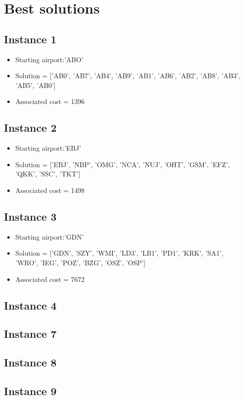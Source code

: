 \chapter{Best solutions}
\label{AppendixD}

\section*{Instance 1}
\begin{itemize}
    \item Starting airport:'ABO'
    \item Solution = ['AB0', 'AB7', 'AB4', 'AB9', 'AB1', 'AB6', 'AB2', 'AB8', 'AB3', 'AB5', 'AB0']
    \item Associated cost = 1396
\end{itemize}

\section*{Instance 2}
\begin{itemize}
    \item Starting airport:'EBJ'
    \item Solution = ['EBJ', 'NBP', 'OMG', 'NCA', 'NUJ', 'OHT', 'GSM', 'EFZ', 'QKK', 'SSC', 'TKT']
    \item Associated cost = 1498
\end{itemize}
\section*{Instance 3}
\begin{itemize}
    \item Starting airport:'GDN'
    \item Solution = ['GDN', 'SZY', 'WMI', 'LD3', 'LB1', 'PD1', 'KRK', 'SA1', 'WRO', 'IEG', 'POZ', 'BZG', 'OSZ', 'OSP']
    \item Associated cost = 7672
\end{itemize}

\section*{Instance 4}
\section*{Instance 7}
\section*{Instance 8}
\section*{Instance 9}



